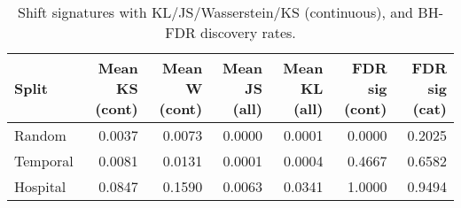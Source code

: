 \begin{table}[H]
\centering
\caption{Shift signatures with KL/JS/Wasserstein/KS (continuous), and BH-FDR discovery rates.}
\label{tab:shift-signature-klw}
\begin{tabular}{l r r r r r r}
\toprule
Split & Mean KS (cont) & Mean W (cont) & Mean JS (all) & Mean KL (all) & FDR sig (cont) & FDR sig (cat) \\
\midrule
Random & 0.0037 & 0.0073 & 0.0000 & 0.0001 & 0.0000 & 0.2025 \\
Temporal & 0.0081 & 0.0131 & 0.0001 & 0.0004 & 0.4667 & 0.6582 \\
Hospital & 0.0847 & 0.1590 & 0.0063 & 0.0341 & 1.0000 & 0.9494 \\
\bottomrule
\end{tabular}
\end{table}